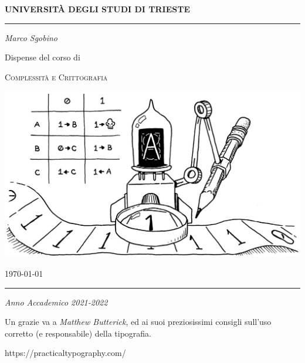 \thispagestyle{plain}
\begin{titlepage}
        \begin{center}
                \Large
                \textbf{UNIVERSITÀ DEGLI STUDI DI TRIESTE}

                \par\noindent\rule{\textwidth}{0.8pt}
                \vspace*{0.6cm}

                \large
                \emph{Marco Sgobino}

                \large
                \vspace*{0.6cm}

                \Large Dispense del corso di
                \vspace*{0.6cm}

                \Huge
                \textsc{Complessità e Crittografia}
                \vspace*{.1cm}


                \vspace*{2cm}

                \begin{center}
                        \includegraphics[width=.9\textwidth, keepaspectratio]{./pics/turing-machine-titlepage.jpg}
                \end{center}
                \vspace*{1cm}
                \large
                \today


                \vfill

                \par\noindent\rule{\textwidth}{0.8pt}
                \vspace*{0.6cm}
                \large
                \emph{Anno Accademico 2021-2022}

                \newpage

                \thispagestyle{plain}
                \vspace*{0.5cm}
                \vfill
                \large

                Un grazie va a \emph{Matthew Butterick}, ed ai suoi preziosissimi consigli sull'uso corretto (e responsabile) della tipografia.

                https://practicaltypography.com/

        \end{center}
\end{titlepage}

